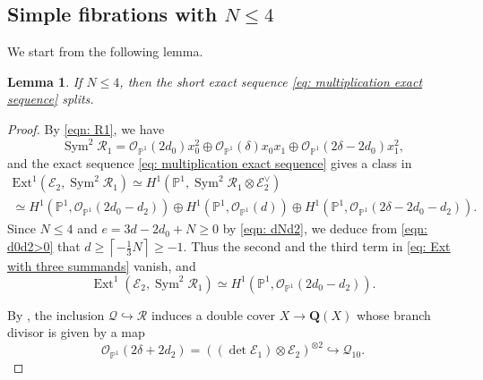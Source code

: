 \documentclass[a4paper,11pt]{amsart}
\newcommand{\PP}{\ensuremath{\mathbb{P}}}
\DeclareMathOperator{\Ext}{Ext}
\DeclareMathOperator{\Sym}{Sym}
\newtheorem{lem}[thm]{Lemma}
\theoremstyle{definition}
\theoremstyle{remark}
\numberwithin{equation}{section}
\begin{document}
\subsection{Simple fibrations with $N \le 4$}
We start from the following lemma.
\begin{lem} \label{lem: epsilon_2 splits}
	If $N \leq 4$, then the short exact sequence \eqref{eq: multiplication exact sequence} splits.
\end{lem}

\begin{proof}
    By \eqref{eqn: R1}, we have
	$$
	\Sym^2 \mathcal{R}_1 = \mathcal{O}_{\PP^1} (2d_0) x_0^2 \oplus \mathcal{O}_{\PP^1} (\delta) x_0x_1 \oplus \mathcal{O}_{\PP^1}(2\delta-2d_0) x_1^2,   
	$$
	and the exact sequence \eqref{eq: multiplication exact sequence} gives a class in
    \begin{multline} \label{eq: Ext with three summands}
        \mathrm{Ext}^1 \left(\mathcal{E}_2, \Sym^2 \mathcal{R}_1\right) \simeq H^1 \left(\PP^1, \Sym^2 \mathcal{R}_1 \otimes \mathcal{E}_2^\vee \right) \\
        \simeq H^1 \left(\PP^1, \mathcal{O}_{\PP^1} (2d_0-d_2) \right)
		\oplus H^1 \left(\PP^1, \mathcal{O}_{\PP^1} (d) \right) \oplus H^1 \left(\PP^1, \mathcal{O}_{\PP^1} (2\delta - 2d_0 - d_2) \right).
    \end{multline}
    Since $N \leq 4$ and $e = 3d-2d_0+N \ge 0$ by \eqref{eqn: dNd2}, we deduce from \eqref{eqn: d0d2>0} that $d \geq \left\lceil - \frac13 N \right\rceil \ge -1$. Thus the second and the third term in \eqref{eq: Ext with three summands} vanish, and
    \begin{equation}\label{eq: Ext with one summand}
		\Ext^1 \left(\mathcal{E}_2, \Sym^2 \mathcal{R}_1\right)
		\simeq H^1 \left(\PP^1, \mathcal{O}_{\PP^1} (2d_0 - d_2) \right).
	\end{equation}
	
	By \cite[Lemma 4.11, Corollary 4.15 and 4.16 (1)]{CP}, the inclusion $\mathcal{Q} \hookrightarrow \mathcal{R}$ induces a double cover $X \to \mathbf{Q}(X)$ whose branch divisor is given by a map
	\begin{equation} \label{eq: branching curve}
		\mathcal{O}_{{\mathbb P}^1}(2\delta + 2d_2) = \left((\det \mathcal{E}_1) \otimes \mathcal{E}_2 \right)^{\otimes 2} \hookrightarrow {\mathcal Q}_{10}.
	\end{equation}
	

\end{proof}
\end{document}
